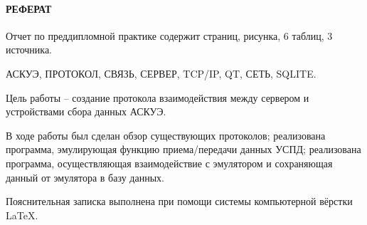 \newpage
{}
\paragraph*{\hfill РЕФЕРАТ \hfill}
Отчет по преддипломной практике содержит  страниц,  рисунка,  6 таблиц, 3 источника. %

АСКУЭ, ПРОТОКОЛ, СВЯЗЬ, СЕРВЕР, TCP/IP, QT, СЕТЬ, SQLITE.

Цель работы -- создание протокола взаимодействия между сервером и устройствами сбора данных АСКУЭ.

В ходе работы был сделан обзор существующих протоколов; реализована программа, эмулирующая функцию приема/передачи данных УСПД; реализована программа, осуществляющая взаимодействие с эмулятором и сохраняющая данный от эмулятора в базу данных.

Пояснительная записка выполнена при помощи системы компьютерной вёрстки \LaTeX.